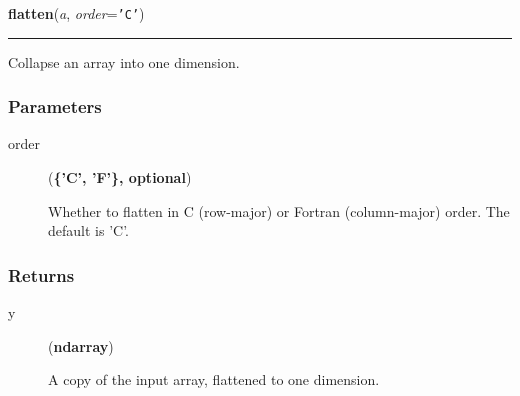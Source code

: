     \label{numpy:ndarray:flatten}

    \vspace{0.5ex}

    \begin{boxedminipage}{\textwidth}

    \raggedright \textbf{flatten}(\textit{a}, \textit{order}=\texttt{'C'})

    \vspace{-1.5ex}

    \rule{\textwidth}{0.5\fboxrule}

Collapse an array into one dimension.



\hypertarget{parameters}{}
\subsubsection*{Parameters}
\begin{description}
\item[{order}] (\textbf{{\{}'C', 'F'{\}}, optional})

Whether to flatten in C (row-major) or Fortran (column-major) order.
The default is 'C'.

\end{description}



\hypertarget{returns}{}
\subsubsection*{Returns}
\begin{description}
\item[{y}] (\textbf{ndarray})

A copy of the input array, flattened to one dimension.

\end{description}



\hypertarget{examples}{}

\end{boxedminipage}
